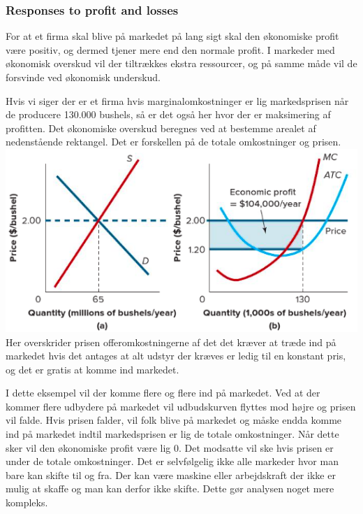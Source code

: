 \subsubsection{Responses to profit and losses}
For at et firma skal blive på markedet på lang sigt skal den økonomiske profit være positiv, og dermed tjener mere end den normale profit. I markeder med økonomisk overskud vil der tiltrækkes ekstra ressourcer, og på samme måde vil de forsvinde ved økonomisk underskud.  

\begin{eks} \textbf{} %
\newline
Hvis vi siger der er et firma hvis marginalomkostninger er lig markedsprisen når de producere 130.000 bushels, så er det også her hvor der er maksimering af profitten. Det økonomiske overskud beregnes ved at bestemme arealet af nedenstående rektangel. Det er forskellen på de totale omkostninger og prisen. 
\includegraphics[scale=0.8]{Afsnit/Lektion3/Okonomiskprofit.png}
Her overskrider prisen offeromkostningerne af det det kræver at træde ind på markedet hvis det antages at alt udstyr der kræves er ledig til en konstant pris, og det er gratis at komme ind markedet. 
\end{eks}

I dette eksempel vil der komme flere og flere ind på markedet. Ved at der kommer flere udbydere på markedet vil udbudskurven flyttes mod højre og prisen vil falde. Hvis prisen falder, vil folk blive på markedet og måske endda komme ind på markedet indtil markedsprisen er lig de totale omkostninger. Når dette sker vil den økonomiske profit være lig 0. Det modsatte vil ske hvis prisen er under de totale omkostninger. Det er selvfølgelig ikke alle markeder hvor man bare kan skifte til og fra. Der kan være maskine eller arbejdskraft der ikke er mulig at skaffe og man kan derfor ikke skifte. Dette gør analysen noget mere kompleks. 

